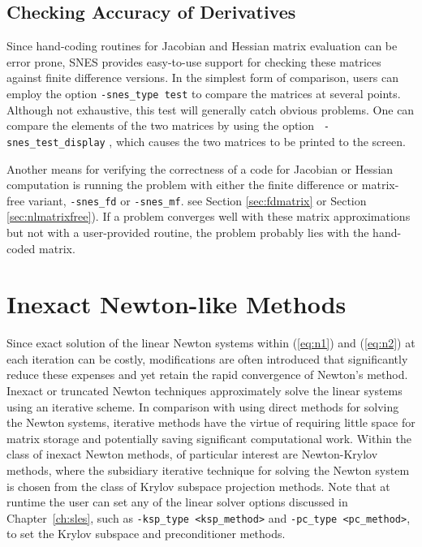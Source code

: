 \subsection{Checking Accuracy of Derivatives}
\label{sec:snesderivs}

Since hand-coding routines for Jacobian and Hessian matrix evaluation
can be error prone, SNES provides easy-to-use support for checking
these matrices against finite difference versions.  In the simplest
form of comparison, users can employ the option {\tt -snes\_type test}
to compare the matrices at several points.  Although not exhaustive,
this test will generally catch obvious problems.  One can compare the
elements of the two matrices by using the option {\tt
-snes\_test\_display} , which causes the two 
matrices to be printed to the screen.  

Another means for verifying the correctness of a code for Jacobian or
Hessian computation is running the problem with either the finite
difference or matrix-free variant, {\tt -snes\_fd} or {\tt -snes\_mf}.
see Section \ref{sec:fdmatrix} or Section \ref{sec:nlmatrixfree}). 
If a problem converges well
with these matrix approximations but not with a user-provided routine,
the problem probably lies with the hand-coded
matrix.  

\section{Inexact Newton-like Methods}

Since exact solution of the linear Newton systems within (\ref{eq:n1}) 
and (\ref{eq:n2}) at each iteration can be costly, modifications 
are often introduced that significantly reduce these expenses and 
yet retain the rapid convergence of Newton's method.  Inexact or 
truncated Newton techniques approximately solve the linear systems 
using an iterative scheme.  In comparison with using direct methods 
for solving the Newton systems, iterative methods have the virtue 
of requiring little space for matrix storage and potentially saving 
significant computational work.  Within the class of inexact Newton 
methods, of particular interest are Newton-Krylov methods, where the 
subsidiary iterative technique for solving the Newton system is 
chosen from the class of Krylov subspace projection methods. 
Note that at runtime the user can set any of the linear solver
options discussed in Chapter~\ref{ch:sles}, such as 
{\tt -ksp\_type <ksp\_method>} and {\tt -pc\_type <pc\_method>},
to set the Krylov subspace and preconditioner methods.

